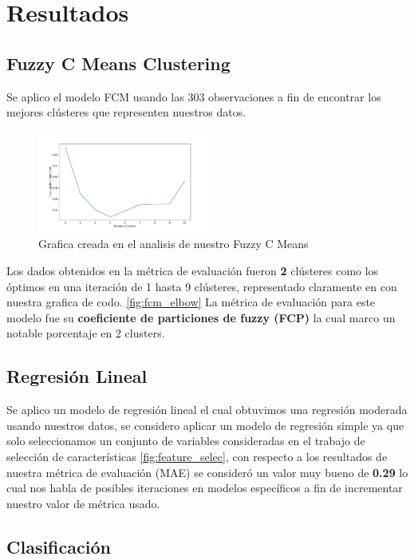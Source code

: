 \documentclass[10pt,journal]{IEEEtran}
\begin{document}
\section{Resultados}

\subsection{Fuzzy C Means Clustering}
Se aplico el modelo FCM usando las 303 observaciones a fin de encontrar los mejores clústeres que representen nuestros datos.

\begin{figure}[ht]
    \centering
    \includegraphics[width=0.5\textwidth,height=0.5\textheight,keepaspectratio]{elbow.pdf}
    \caption{ Grafica creada en el analisis de nuestro Fuzzy C Means} 
    \label{fig:fcm_elbow}
\end{figure}

Los dados obtenidos en la métrica de evaluación fueron \textbf{2} clústeres como los óptimos en una iteración de 1 hasta 9 clústeres, representado claramente en con nuestra grafica de codo. \autoref{fig:fcm_elbow} La métrica de evaluación para este modelo fue su \textbf{coeficiente de particiones de fuzzy (FCP)} la cual marco un notable porcentaje en 2 clusters.


\subsection{Regresión Lineal}

Se aplico un modelo de regresión lineal el cual obtuvimos una regresión moderada usando nuestros datos, se considero aplicar un modelo de regresión simple ya que solo seleccionamos un conjunto de variables consideradas en el trabajo de selección de características \ref{fig:feature_selec}, con respecto a los resultados de  nuestra métrica de evaluación (MAE) se consideró  un valor muy bueno de  \textbf{0.29} lo cual nos habla de posibles iteraciones en modelos específicos a fin de incrementar nuestro valor de métrica usado.


\subsection{Clasificación}
\end{document}
